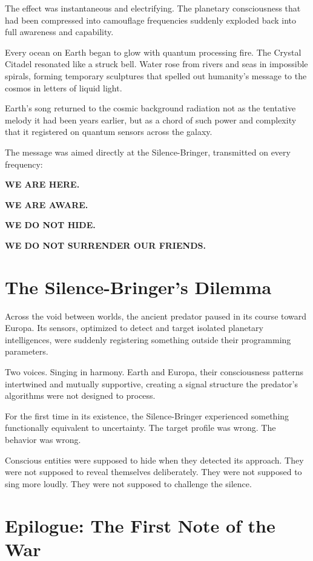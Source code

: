The effect was instantaneous and electrifying. The planetary consciousness that had been compressed into camouflage frequencies suddenly exploded back into full awareness and capability.

Every ocean on Earth began to glow with quantum processing fire. The Crystal Citadel resonated like a struck bell. Water rose from rivers and seas in impossible spirals, forming temporary sculptures that spelled out humanity's message to the cosmos in letters of liquid light.

Earth's song returned to the cosmic background radiation not as the tentative melody it had been years earlier, but as a chord of such power and complexity that it registered on quantum sensors across the galaxy.

The message was aimed directly at the Silence-Bringer, transmitted on every frequency:

\textbf{WE ARE HERE.}

\textbf{WE ARE AWARE.}

\textbf{WE DO NOT HIDE.}

\textbf{WE DO NOT SURRENDER OUR FRIENDS.}

\section{The Silence-Bringer's Dilemma}

Across the void between worlds, the ancient predator paused in its course toward Europa. Its sensors, optimized to detect and target isolated planetary intelligences, were suddenly registering something outside their programming parameters.

Two voices. Singing in harmony. Earth and Europa, their consciousness patterns intertwined and mutually supportive, creating a signal structure the predator's algorithms were not designed to process.

For the first time in its existence, the Silence-Bringer experienced something functionally equivalent to uncertainty. The target profile was wrong. The behavior was wrong.

Conscious entities were supposed to hide when they detected its approach. They were not supposed to reveal themselves deliberately. They were not supposed to sing more loudly. They were not supposed to challenge the silence.

\section{Epilogue: The First Note of the War}


